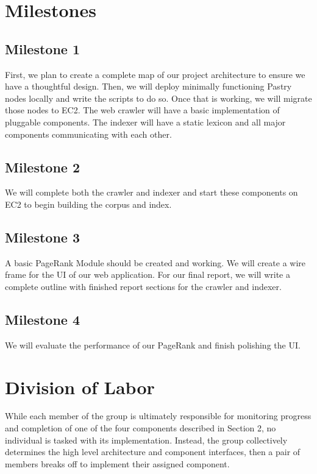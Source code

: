 \documentclass[11pt, twocolumn]{article}
\begin{document}
\section{ Milestones }

\subsection{Milestone 1}
First, we plan to create a complete map of our project architecture to ensure we
have a thoughtful design. Then, we will deploy minimally functioning
Pastry nodes locally and write the scripts to do so. Once that is
working, we will migrate those nodes to EC2. The web crawler will have a basic
implementation of pluggable components. The indexer will have a static lexicon
and all major components communicating with each other. 


\subsection{Milestone 2}
We will complete both the crawler and indexer and start these components on EC2
to begin building the corpus and index. 


\subsection{Milestone 3}
A basic PageRank Module should be created and working. We will create a wire
frame for the UI of our web application. For our final report, we will write a complete outline with finished report sections for the crawler
and indexer. 


\subsection{Milestone 4}
We will evaluate the performance of our PageRank and finish polishing the UI. 


\section{ Division of Labor }

While each member of the group is ultimately responsible for monitoring progress and completion of  one of the four components described in Section 2, no individual is tasked with its implementation.  Instead, the group collectively determines the high level architecture and component interfaces, then a pair of members breaks off to implement their assigned component. 
\end{document}
